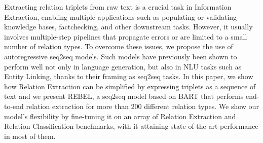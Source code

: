 Extracting relation triplets from raw text is a crucial task in Information Extraction, enabling multiple applications such as populating or validating knowledge bases, factchecking, and other downstream tasks. However, it usually involves multiple-step pipelines that propagate errors or are limited to a small number of relation types. To overcome these issues, we propose the use of autoregressive seq2seq models. Such models have previously been shown to perform well not only in language generation, but also in NLU tasks such as Entity Linking, thanks to their framing as seq2seq tasks. In this paper, we show how Relation Extraction can be simplified by expressing triplets as a sequence of text and we present REBEL, a seq2seq model based on BART that performs end-to-end relation extraction for more than 200 different relation types. We show our model's flexibility by fine-tuning it on an array of Relation Extraction and Relation Classification benchmarks, with it attaining state-of-the-art performance in most of them.
